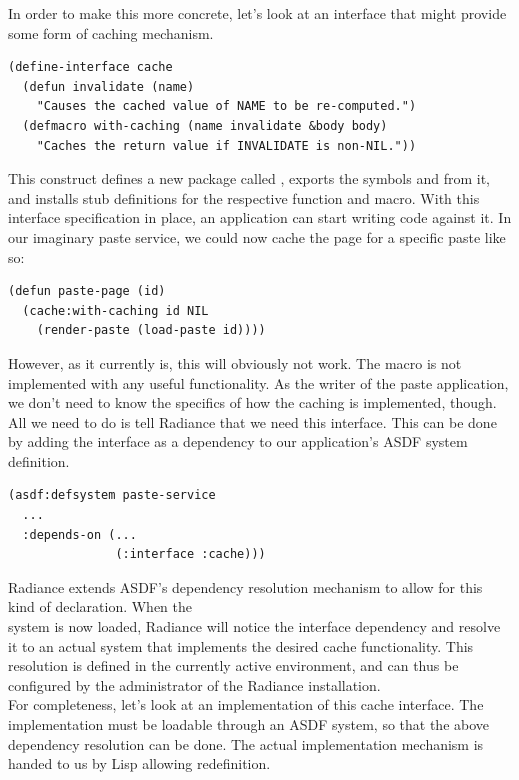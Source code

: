 \documentclass{sig-alternate}
\begin{document}
In order to make this more concrete, let's look at an interface that might provide some form of caching mechanism.

\begin{verbatim}
(define-interface cache
  (defun invalidate (name)
    "Causes the cached value of NAME to be re-computed.")
  (defmacro with-caching (name invalidate &body body)
    "Caches the return value if INVALIDATE is non-NIL."))
\end{verbatim}

This construct defines a new package called , exports the symbols  and  from it, and installs stub definitions for the respective function and macro. With this interface specification in place, an application can start writing code against it. In our imaginary paste service, we could now cache the page for a specific paste like so:

\begin{verbatim}
(defun paste-page (id)
  (cache:with-caching id NIL
    (render-paste (load-paste id))))
\end{verbatim}

However, as it currently is, this will obviously not work. The  macro is not implemented with any useful functionality. As the writer of the paste application, we don't need to know the specifics of how the caching is implemented, though. All we need to do is tell Radiance that we need this interface. This can be done by adding the interface as a dependency to our application's ASDF system definition.

\begin{verbatim}
(asdf:defsystem paste-service
  ...
  :depends-on (...
               (:interface :cache)))
\end{verbatim}

Radiance extends ASDF's dependency resolution mechanism to allow for this kind of declaration. When the \\ system is now loaded, Radiance will notice the interface dependency and resolve it to an actual system that implements the desired cache functionality. This resolution is defined in the currently active environment, and can thus be configured by the administrator of the Radiance installation. \\

For completeness, let's look at an implementation of this cache interface. The implementation must be loadable through an ASDF system, so that the above dependency resolution can be done. The actual implementation mechanism is handed to us by Lisp allowing redefinition.
\end{document}
